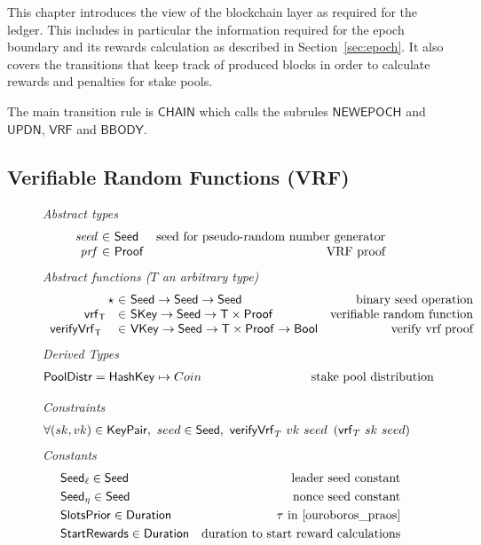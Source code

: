 This chapter introduces the view of the blockchain layer as required for the
ledger. This includes in particular the information required for the epoch
boundary and its rewards calculation as described in Section~\ref{sec:epoch}. It
also covers the transitions that keep track of produced blocks in order to
calculate rewards and penalties for stake pools.

The main transition rule is $\mathsf{CHAIN}$ which calls the subrules
$\mathsf{NEWEPOCH}$ and $\mathsf{UPDN}$, $\mathsf{VRF}$ and $\mathsf{BBODY}$.

\subsection{Verifiable Random Functions (VRF)}
\label{sec:defs-vrf}

\begin{figure}[htb]
  \emph{Abstract types}
  \begin{equation*}
    \begin{array}{r@{~\in~}lr}
      \var{seed} & \Seed  & \text{seed for pseudo-random number generator}\\
      \var{prf} & \Proof  & \text{VRF proof}\\
    \end{array}
  \end{equation*}
  \emph{Abstract functions ($T$ an arbitrary type)}
  \begin{equation*}
    \begin{array}{r@{~\in~}lr}
      \seedOp & \Seed \to \Seed \to \Seed & \text{binary seed operation} \\
      \vrf{\T}{}{} & \SKey \to \Seed \to \T\times\Proof
                   & \text{verifiable random function} \\
      \verifyVrf{\T}{}{}{} & \VKey \to \Seed \to \T\times\Proof \to \Bool
                           & \text{verify vrf proof} \\
    \end{array}
  \end{equation*}
  \emph{Derived Types}
  \begin{align*}
    \PoolDistr = \HashKey \mapsto Coin \text{ \hspace{3cm}stake pool distribution}
  \end{align*}

  \emph{Constraints}
  \begin{align*}
    & \forall (sk, vk) \in \mathsf{KeyPair},~ seed \in \mathsf{Seed},~
    \mathsf{verifyVrf}_{T} ~ vk ~ seed ~\left(\mathsf{vrf}_{T} ~ sk ~ seed\right)
  \end{align*}
  \emph{Constants}
  \begin{align*}
    & \mathsf{Seed}_\ell \in \mathsf{Seed} & \text{leader seed constant} \\
    & \mathsf{Seed}_\eta \in \mathsf{Seed} & \text{nonce seed constant}\\
    & \mathsf{SlotsPrior} \in \mathsf{Duration} & \tau\text{ in \cite{ouroboros_praos}}\\
    & \mathsf{StartRewards} \in \mathsf{Duration} & \text{duration to start reward calculations}\\
  \end{align*}


\end{figure}
